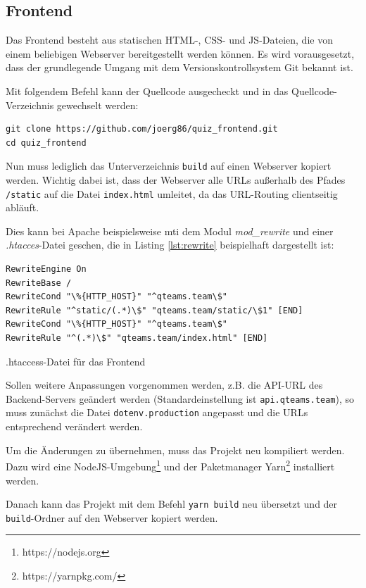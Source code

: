 \documentclass[a4paper,11pt,listof=numbered,glossary=totoc,parskip=half,toc=bib]{scrreprt}
\begin{document}
\begin{appendices}
	\section{Frontend}
	
	Das Frontend besteht aus statischen HTML-, CSS- und JS-Dateien, die von einem beliebigen Webserver bereitgestellt werden können.
	Es wird vorausgesetzt, dass der grundlegende Umgang mit dem Versionskontrollsystem Git bekannt ist.
	
	Mit folgendem Befehl kann der Quellcode ausgecheckt und in das Quellcode-Verzeichnis gewechselt werden:		
	\begin{verbatim}
git clone https://github.com/joerg86/quiz_frontend.git
cd quiz_frontend
	\end{verbatim}
	
	Nun muss lediglich das Unterverzeichnis \texttt{build} auf einen Webserver kopiert werden. Wichtig dabei ist, dass der Webserver alle URLs außerhalb des Pfades \texttt{/static} auf die Datei \texttt{index.html} umleitet, da das URL-Routing clientseitig abläuft.
	
	Dies kann bei Apache beispielsweise mti dem Modul \textit{mod\_{}rewrite} und einer \textit{.htacces}-Datei geschen, die in Listing \ref{lst:rewrite} beispielhaft dargestellt ist:
	\begin{listing}
	\begin{verbatim}
RewriteEngine On
RewriteBase /
RewriteCond "\%{HTTP_HOST}" "^qteams.team\$" 
RewriteRule "^static/(.*)\$" "qteams.team/static/\$1" [END]
RewriteCond "\%{HTTP_HOST}" "^qteams.team\$" 
RewriteRule "^(.*)\$" "qteams.team/index.html" [END]
	\end{verbatim}
		\caption{.htaccess-Datei für das Frontend}
		\label{lst:rewrite}
	\end{listing}
	
	Sollen weitere Anpassungen vorgenommen werden, z.B. die API-URL des Backend-Servers geändert werden (Standardeinstellung ist \texttt{api.qteams.team}), so muss zunächst die Datei \texttt{dotenv.production} angepasst und die URLs entsprechend verändert werden.
	
	Um die Änderungen zu übernehmen, muss das Projekt neu kompiliert werden. Dazu wird eine NodeJS-Umgebung\footnote{https://nodejs.org} und der Paketmanager Yarn\footnote{https://yarnpkg.com/} installiert werden.
	
	Danach kann das Projekt mit dem Befehl \texttt{yarn build} neu übersetzt und der \texttt{build}-Ordner auf den Webserver kopiert werden.
	

\end{appendices}
\end{document}
